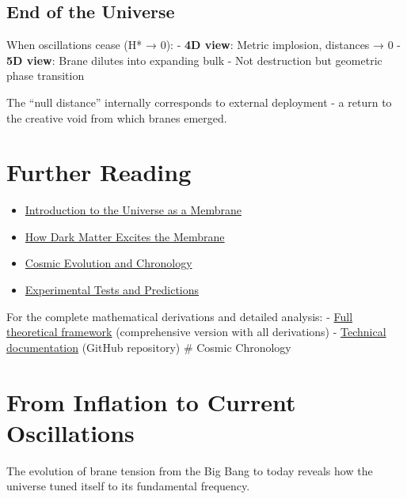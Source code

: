 \documentclass[
  11pt,
]{report}
\providecommand{\tightlist}{%
  \setlength{\itemsep}{0pt}\setlength{\parskip}{0pt}}
\begin{document}
\subsection{End of the Universe}\label{end-of-the-universe}

When oscillations cease (H* → 0): - \textbf{4D view}: Metric implosion,
distances → 0 - \textbf{5D view}: Brane dilutes into expanding bulk -
Not destruction but geometric phase transition

The ``null distance'' internally corresponds to external deployment - a
return to the creative void from which branes emerged.

\section{Further Reading}\label{further-reading}

\begin{itemize}
\tightlist
\item
  \href{\%7B\%7B\%20site.baseurl\%20\%7D\%7D\%7B\%\%20post_url\%202024-01-15-introduction-universe-membrane\%20\%\%7D}{Introduction
  to the Universe as a Membrane}
\item
  \href{\%7B\%7B\%20site.baseurl\%20\%7D\%7D\%7B\%\%20post_url\%202024-01-16-microscopic-excitation\%20\%\%7D}{How
  Dark Matter Excites the Membrane}
\item
  \href{\%7B\%7B\%20site.baseurl\%20\%7D\%7D\%7B\%\%20post_url\%202024-01-17-cosmic-chronology\%20\%\%7D}{Cosmic
  Evolution and Chronology}
\item
  \href{\%7B\%7B\%20site.baseurl\%20\%7D\%7D\%7B\%\%20post_url\%202024-01-18-observational-tests\%20\%\%7D}{Experimental
  Tests and Predictions}
\end{itemize}

For the complete mathematical derivations and detailed analysis: -
\href{/theory-complete/}{Full theoretical framework} (comprehensive
version with all derivations) -
\href{https://github.com/\%7B\%7B\%20site.github_username\%20\%7D\%7D/oscillating-brane-DM/tree/main/docs}{Technical
documentation} (GitHub repository) \newpage \# Cosmic Chronology

\section{From Inflation to Current
Oscillations}\label{from-inflation-to-current-oscillations}

The evolution of brane tension from the Big Bang to today reveals how
the universe tuned itself to its fundamental frequency.
\end{document}
